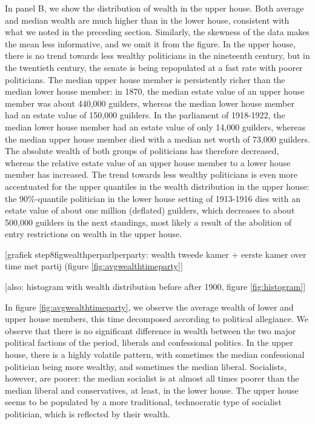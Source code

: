     In panel B, we show the distribution of wealth in the upper house. Both average and median wealth are much higher than in the lower house, consistent with what we noted in the preceding section. Similarly, the skewness of the data makes the mean less informative, and we omit it from the figure. In the upper house, there is no trend towards less wealthy politicians in the nineteenth century, but in the twentieth century, the senate is being repopulated at a fast rate with poorer politicians. The median upper house member is persistently richer than the median lower house member: in 1870, the median estate value of an upper house member was about 440,000 guilders, whereas the median lower house member had an estate value of 150,000 guilders. In the parliament of 1918-1922, the median lower house member had an estate value of only 14,000 guilders, whereas the median upper house member died with a median net worth of 73,000 guilders. The absolute wealth of both groups of politicians has therefore decreased, whereas the relative estate value of an upper house member to a lower house member has increased. The trend towards less wealthy politicians is even more accentuated for the upper quantiles in the wealth distribution in the upper house: the 90\%-quantile politician in the lower house setting of 1913-1916 dies with an estate value of about one million (deflated) guilders, which decreases to about 500,000 guilders in the next standings, most likely a result of the abolition of entry restrictions on wealth in the upper house. 
    
    \begin{center}
        [grafiek step8figwealthperparlperparty: wealth tweede kamer + eerste kamer over time met partij (figure \ref{fig:avgwealthtimeparty}]
        
        [also: histogram with wealth distribution before after 1900, figure \ref{fig:histogram}]
    \end{center}
    
    In figure \ref{fig:avgwealthtimeparty}, we observe the average wealth of lower and upper house members, this time decomposed according to political allegiance. We observe that there is no significant difference in wealth between the two major political factions of the period, liberals and confessional politics. In the upper house, there is a highly volatile pattern, with sometimes the median confessional politician being more wealthy, and sometimes the median liberal. Socialists, however, are poorer: the median socialist is at almost all times poorer than the median liberal and conservatives, at least, in the lower house. The upper house seems to be populated by a more traditional, technocratic type of socialist politician, which is reflected by their wealth. 
    
